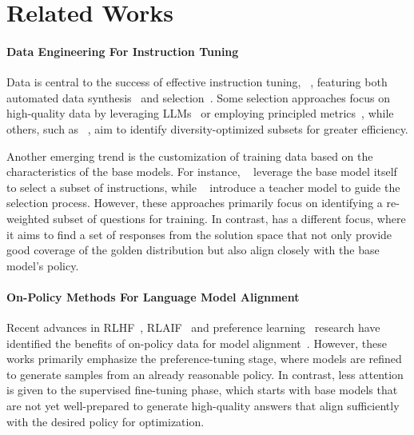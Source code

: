 \section{Related Works}
\paragraph{Data Engineering For Instruction Tuning}

Data is central to the success of effective instruction tuning, ~\cite{xu2023rethinkinginstructionqualitylift,xia2024less,chan2024balancingcosteffectivenesssynthetic}, featuring both automated data synthesis~\cite{xu2024wizardlm,zeng2024automatic,yu2024metamath,wei2023magicoder} and selection~\cite{xia2024less,chen2023alpagasus,parkar2024selectllm,li2024scar}. Some selection approaches focus on high-quality data by leveraging LLMs~\cite{chen2023alpagasus,parkar2024selectllm,li2024superfilteringweaktostrongdatafiltering} or employing principled metrics~\cite{kang2024getmoreforless,mekala2024smaller,xia2024less}, while others, such as ~\citet{yang2024smalltolarge,das2023deft}, aim to identify diversity-optimized subsets for greater efficiency.

Another emerging trend is the customization of training data based on the characteristics of the base models. For instance, ~\citet{li2024quantitytoqulality,du2023modsmodelorienteddataselection} leverage the base model itself to select a subset of instructions, while ~\citet{li2024selective} introduce a teacher model to guide the selection process. However, these approaches primarily focus on identifying a re-weighted subset of questions for training. In contrast, \name has a different focus, where it aims to find a set of responses from the solution space that not only provide good coverage of the golden distribution but also align closely with the base model's policy.

\paragraph{On-Policy Methods For Language Model Alignment}

Recent advances in RLHF~\cite{ouyang2022training}, RLAIF~\cite{lee2024rlaif} and preference learning~\cite{rafailov2023dpo} research have identified the benefits of on-policy data for model alignment~\cite{xu2024dposuperiorppollm,tajwar2024shoulduse,zhang2024selfexploringlanguagemodelsactive,guo2024onlineaifeedback,liu2024provablymitigatingoveroptimizationrlhf,zhang2024textbfplumimprovingcodelms,miao2024aligningcodellmsdirectpreference,gulcehre2023rest}. However, these works primarily emphasize the preference-tuning stage, where models are refined to generate samples from an already reasonable policy. In contrast, less attention is given to the supervised fine-tuning phase, which starts with base models that are not yet well-prepared to generate high-quality answers that align sufficiently with the desired policy for optimization.



